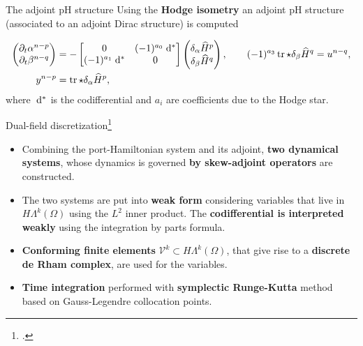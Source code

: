 \documentclass[aspectratio=169]{beamer}
\DeclareMathOperator{\tr}{tr}
\newcommand*{\dual}[1]{\ensuremath{\widehat{#1}}}
\begin{document}
\begin{frame}{The adjoint pH structure}
	Using the \textbf{Hodge isometry} an adjoint pH structure (associated to an adjoint Dirac structure) is computed
	
	\begin{tcolorbox}[nobeforeafter, colframe=theme,title=Adjoint pH system]%
	\begin{equation*}
		\begin{aligned}
			\begin{pmatrix}
				\partial_t {\alpha}^{n-p} \\
				\partial_t {\beta}^{n-q} \\
			\end{pmatrix} &= -
			\begin{bmatrix}
				0 &  (-1)^{a_0}\d{}^* \\
				(-1)^{a_1}\d{}^* & 0 \\
			\end{bmatrix}
			\begin{pmatrix}
				\delta_{\alpha} \dual{H}^p \\
				\delta_{{\beta}} \dual{H}^q
			\end{pmatrix}, \qquad (-1)^{a_3}\tr \star \delta_{{\beta}} \dual{H}^q= u^{n-q}, \\
			y^{n-p} &= \tr \star \delta_{\alpha} \dual{H}^p,
		\end{aligned}
	\end{equation*}
	where $\d{}^{*}$ is the codifferential and $a_i$ are coefficients due to the Hodge star.
	\end{tcolorbox} 

\end{frame}
	
\begin{frame}{Dual-field discretization\footcite{brugnoli2022df}}
	\begin{itemize}
		\item Combining the port-Hamiltonian system and its adjoint, \textbf{two dynamical systems}, whose dynamics is governed \textbf{by skew-adjoint operators} are constructed.
		\item The two systems are put into \textbf{weak form} considering variables that live in $H\Lambda^k(\Omega)$ using the $L^2$ inner product. The \textbf{codifferential is interpreted weakly} using the integration by parts formula.
		\item \textbf{Conforming finite elements} $\mathcal{V}^k \subset H\Lambda^k(\Omega)$, that give rise to a \textbf{discrete de Rham complex}, are used for the variables.
		\item \textbf{Time integration} performed with \textbf{symplectic Runge-Kutta} method based on Gauss-Legendre collocation points.
	\end{itemize}
	
\end{frame}
\end{document}

